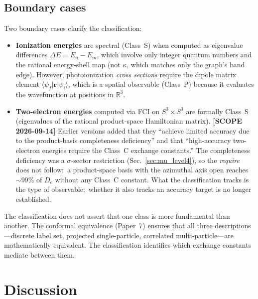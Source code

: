 \documentclass[aps,pra,twocolumn,superscriptaddress,longbibliography]{revtex4-2}
\begin{document}
\subsection{Boundary cases}

Two boundary cases clarify the classification:

\begin{itemize}
  \item \textbf{Ionization energies} are spectral (Class~S) when
    computed as eigenvalue differences $\Delta E = E_n - E_m$,
    which involve only integer quantum numbers and the rational
    energy-shell map (not $\kappa$, which matches only the graph's
    band edge).
    However, photoionization \emph{cross sections} require the
    dipole matrix element $\langle \psi_f | \mathbf{r} | \psi_i
    \rangle$, which is a spatial observable (Class~P) because
    it evaluates the wavefunction at positions in $\mathbb{R}^3$.

  \item \textbf{Two-electron energies} computed via FCI on
    $S^3 \times S^3$ are formally Class~S (eigenvalues of the
    rational product-space Hamiltonian matrix).  \textbf{[SCOPE 2026-09-14]}
    Earlier versions added that they ``achieve limited accuracy due to
    the product-basis completeness deficiency'' and that ``high-accuracy
    two-electron energies require the Class~C exchange constants.''  The
    completeness deficiency was a $\sigma$-sector restriction
    (Sec.~\ref{sec:mu_level4}), so the \emph{require} does not follow:\ a
    product-space basis with the azimuthal axis open reaches ${\sim}99\%$
    of $D_e$ without any Class~C constant.  What the classification tracks
    is the type of observable;\ whether it also tracks an accuracy target
    is no longer established.
\end{itemize}

The classification does not assert that one class is more
fundamental than another.  The conformal equivalence
(Paper~7) ensures that all three descriptions---discrete label set,
projected single-particle, correlated multi-particle---are
mathematically equivalent.  The classification identifies which exchange
constants mediate between them.



\section{Discussion}
\label{sec:discussion}
\end{document}
